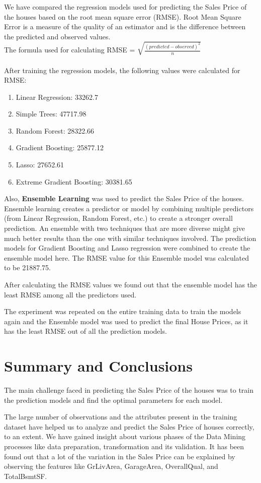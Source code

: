 \documentclass[fleqn,10pt]{SelfArx} %
\begin{document}
We have compared the regression models used for predicting the Sales Price of the houses based on the root mean square error (RMSE). Root Mean Square Error is a measure of the quality of an estimator and is the difference between the predicted and observed values.
\\ The formula used for calculating RMSE = $\sqrt{\frac{(predicted-observed)^2}{n}}$
\\ \\After training the regression models, the following values were calculated for RMSE:
\begin{enumerate}[noitemsep] 
\item Linear Regression: 33262.7
\item Simple Trees: 47717.98
\item Random Forest: 28322.66
\item Gradient Boosting: 25877.12
\item Lasso: 27652.61
\item Extreme Gradient Boosting: 30381.65
\end{enumerate}
Also, \textbf{Ensemble Learning} was used to predict the Sales Price of the houses. Ensemble learning creates a predictor or model by combining multiple predictors (from Linear Regression, Random Forest, etc.) to create a stronger overall prediction. An ensemble with two techniques that are more diverse might give much better results than the one with similar techniques involved.
The prediction models for Gradient Boosting and Lasso regression were combined to create the ensemble model here.
The RMSE value for this Ensemble model was calculated to be 21887.75.

After calculating the RMSE values we found out that the ensemble model has the least RMSE among all the predictors used.

The experiment was repeated on the entire training data to train the models again and the Ensemble model was used to predict the final House Prices, as it has the least RMSE out of all the prediction models.



\section{Summary and Conclusions}
The main challenge faced in predicting the Sales Price of the houses was to train the prediction models and find the optimal parameters for each model.

The large number of observations and the attributes present in the training dataset have helped us to analyze and predict the Sales Price of houses correctly, to an extent. We have gained insight about various phases of the Data Mining processes like data preparation, transformation and its validation. It has been found out that a lot of the variation in the Sales Price can be explained by observing the features like GrLivArea, GarageArea, OverallQual, and TotalBsmtSF.
\end{document}
